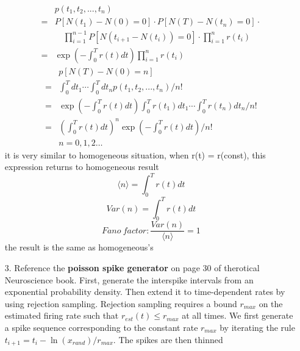 \documentclass{article}
\begin{document}
\begin{enumerate}
\begin{equation}
\begin{split}
                  &p(t_1,t_2,...,t_n) \\
                  =&P[N(t_1)-N(0) = 0]\cdot P[N(T)-N(t_n) = 0]\cdot\\
                  &\quad \prod_{i = 1}^{n-1}P[N(t_{i+1}-N(t_i)) = 0]\cdot\prod^{n}_{i = 1}r(t_i) \\
                  = &\exp\left(-\int_0^Tr(t)dt\right)\prod_{i=1}^{n}r(t_i)
              \end{split}
          \end{equation}
          \begin{equation}
              \begin{split}
                  &p[N(T)-N(0) = n]\\
                  =& \int_0^T dt_1 \cdots\int_0^Tdt_np(t_1,t_2,...,t_n)/n!\\
                  =& \exp\left(-\int_0^Tr(t)dt\right)\int_0^Tr(t_1)dt_1\cdots\int_0^Tr(t_n)dt_n/n!\\
                  =&\left(\int_0^Tr(t)dt\right)^n\exp\left(-\int_0^Tr(t)dt\right)/n!\\
                  &n=0,1,2\dots
              \end{split}
          \end{equation}
          it is very similar to homogeneous situation, when r(t) = r(const), this expression returns to homogeneous result
          \begin{equation}
              \langle n \rangle = \int_0^Tr(t)dt
          \end{equation}
          \begin{equation}
              Var(n) = \int_0^Tr(t)dt
          \end{equation}
          \begin{equation}
              Fano\ factor:\dfrac{Var(n)}{\langle n \rangle} = 1
          \end{equation}
          the result is the same as homogeneous's
    \item[3.]Reference the \textbf{poisson spike generator} on page 30 of therotical Neuroscience book.
          First, generate the interspike intervals from an exponential probability density. Then extend it to time-dependent rates by using
          rejection sampling. Rejection sampling requires a bound $r_{max}$ on the estimated firing rate such that $r_{est}(t) \leq r_{max}$ at all times.
          We first generate a spike sequence corresponding to the constant rate $r_{max}$
          by iterating the rule $t_{i+1} = t_i - \ln(x_{rand})/r_{max}$. The spikes are then thinned

\end{enumerate}
\end{document}
